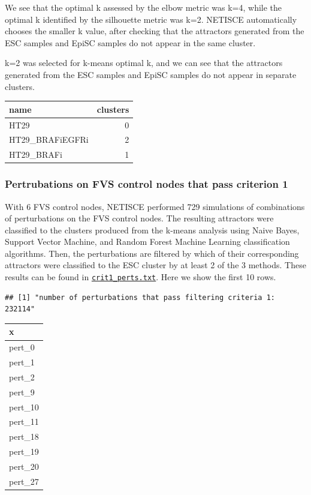 \documentclass[
]{book}
\begin{document}
We see that the optimal k assessed by the elbow metric was k=4, while the optimal k identified by the silhouette metric was k=2. NETISCE automatically chooses the smaller k value, after checking that the attractors generated from the ESC samples and EpiSC samples do not appear in the same cluster.

k=2 was selected for k-means optimal k, and we can see that the attractors generated from the ESC samples and EpiSC samples do not appear in separate clusters.

\begin{tabular}{l|r}
\hline
name & clusters\\
\hline
HT29 & 0\\
\hline
HT29\_BRAFiEGFRi & 2\\
\hline
HT29\_BRAFi & 1\\
\hline
\end{tabular}

\hypertarget{section-id}{%
\subsubsection*{Pertrubations on FVS control nodes that pass criterion 1}\label{section-id}}

With 6 FVS control nodes, NETISCE performed 729 simulations of combinations of perturbations on the FVS control nodes. The resulting attractors were classified to the clusters produced from the k-means analysis using Naive Bayes, Support Vector Machine, and Random Forest Machine Learning classification algorithms. Then, the perturbations are filtered by which of their corresponding attractors were classified to the ESC cluster by at least 2 of the 3 methods. These results can be found in \href{https://github.com/VeraLiconaResearchGroup/Netisce/blob/main/ipsc_validation/results/crit1perts.txt}{\texttt{crit1\_perts.txt}}. Here we show the first 10 rows.

\begin{verbatim}
## [1] "number of perturbations that pass filtering criteria 1: 232114"
\end{verbatim}

\begin{tabular}{l}
\hline
x\\
\hline
pert\_0\\
\hline
pert\_1\\
\hline
pert\_2\\
\hline
pert\_9\\
\hline
pert\_10\\
\hline
pert\_11\\
\hline
pert\_18\\
\hline
pert\_19\\
\hline
pert\_20\\
\hline
pert\_27\\
\hline
\end{tabular}
\end{document}
